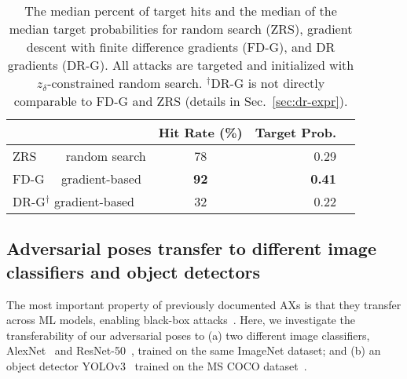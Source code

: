 \documentclass[10pt,twocolumn,letterpaper]{article}
\newcommand{\subsec}[1]{\noindent{\textbf{#1.}}}
\begin{document}
\begin{table}[h]
  \centering
  \begin{tabular}{lcrr}
    \toprule
    & Hit Rate (\%) & Target Prob. \\
    \midrule
    ZRS ~~~~random search & 78 & 0.29 \\
    FD-G ~~gradient-based & \textbf{92} & \textbf{0.41} \\
    DR-G\(^\dagger\) gradient-based & 32 & 0.22 \\
    \bottomrule
  \end{tabular}
  \caption{The median percent of target hits and the median of the median target probabilities
  	for random search (ZRS), gradient descent with finite difference gradients (FD-G), and DR gradients (DR-G).
  	All attacks are targeted and initialized with $z_{\delta}$-constrained random search.
  \(^\dagger\)DR-G is not directly comparable to FD-G and ZRS
  (details in Sec.~\ref{sec:dr-expr}).
	}
  \label{tab:optim_stats}
\end{table}

\subsection{Adversarial poses transfer to different image classifiers and object detectors}

The most important property of previously documented AXs is that they transfer across ML models, enabling black-box attacks~\cite{Yuan2017}.
Here, we investigate the transferability of our adversarial poses to (a) two different image classifiers, AlexNet~\cite{Krizhevsky2012} and ResNet-50~\cite{He2016}, trained on the same ImageNet dataset; and (b) an object detector YOLOv3~\cite{Redmon2018} trained on the MS COCO dataset~\cite{lin2014microsoft}.

\end{document}
